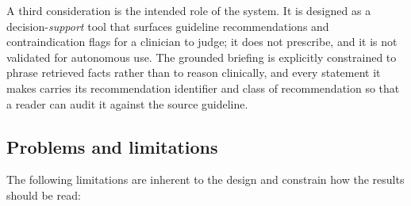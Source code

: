A third consideration is the intended role of the system. It is designed as a
decision-\emph{support} tool that surfaces guideline recommendations and contraindication
flags for a clinician to judge; it does not prescribe, and it is not validated for
autonomous use. The grounded briefing is explicitly constrained to phrase retrieved facts
rather than to reason clinically, and every statement it makes carries its recommendation
identifier and class of recommendation so that a reader can audit it against the source
guideline.

\subsection{Problems and limitations}
\label{sec:limitations}
The following limitations are inherent to the design and constrain how the results should
be read:

